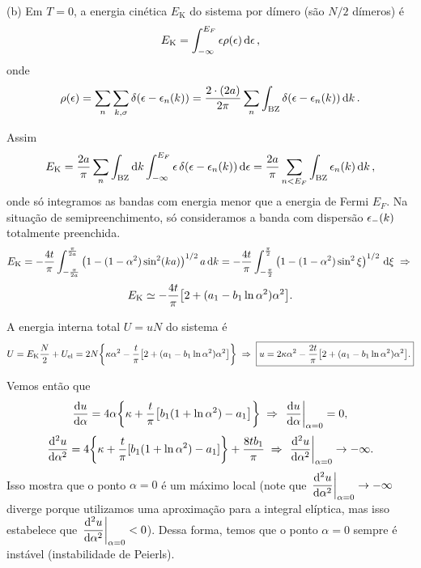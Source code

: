 \documentclass[a4paper,10pt]{article}
\begin{document}
(b) Em $T = 0$, a energia cinética $E_{\text{K}}$ do sistema por dímero (são $N/2$ dímeros) é
$$
E_{\text{K}} = \int_{-\infty}^{E_F} \epsilon \rho(\epsilon) \dd{\epsilon},
$$
onde
$$
\rho(\epsilon) = \sum_{n} \sum_{k, \sigma} \delta(\epsilon - \epsilon_n(k)) =
\frac{2 \cdot (2a)}{2\pi}
\sum_{n} \int_{\text{BZ}} \delta(\epsilon - \epsilon_n(k)) \dd{k}.
$$

Assim
$$
E_{\text{K}} = \frac{2a}{\pi} \sum_{n} \int_{\text{BZ}} \dd{k}
\int_{-\infty}^{E_F} \epsilon \, \delta(\epsilon - \epsilon_n(k)) \dd{\epsilon} =
\frac{2a}{\pi} \sum_{n < E_F} \int_{\text{BZ}} \epsilon_n(k) \dd{k},
$$
onde só integramos as bandas com energia menor que a energia de Fermi $E_F$. Na situação de semipreenchimento, só consideramos a banda com dispersão $\epsilon_-(k)$ totalmente preenchida.
$$
E_{\text{K}} = - \frac{4t}{\pi} \int_{-\frac{\pi}{2a}}^{\frac{\pi}{2a}}
\qty(1 - (1-\alpha^2) \sin[2](ka))^{1/2} \, a\dd{k} =
- \frac{4t}{\pi} \int_{-\frac{\pi}{2}}^{\frac{\pi}{2}}
\qty(1 - (1-\alpha^2) \sin^2\xi)^{1/2} \, \dd{\xi} \; \Rightarrow \;
$$
$$
E_{\text{K}} \simeq -\frac{4t}{\pi}
\qty[2 + (a_1 - b_1 \ln \alpha^2) \alpha^2].
$$

A energia interna total $U = u N$ do sistema é
$$
U = E_{\text{K}} \frac{N}{2} + U_{\text{el}} =
2N \qty{\kappa \alpha^2 -\frac{t}{\pi}
\qty[2 + (a_1 - b_1 \ln \alpha^2) \alpha^2]} \; \Rightarrow \; \boxed{u = 2 \kappa \alpha^2 - \frac{2t}{\pi}
\qty[2 + (a_1 - b_1 \ln \alpha^2) \alpha^2].}
$$

Vemos então que
$$
\dv{u}{\alpha} = 4 \alpha \qty{\kappa + \frac{t}{\pi} \qty[b_1 (1  + \ln \alpha^2) - a_1 ]}
\implies \eval{\dv{u}{\alpha}}_{\alpha=0} = 0,
$$
$$
\dv[2]{u}{\alpha} = 4\qty{\kappa + \frac{t}{\pi}[b_1(1+\ln\alpha^2) - a_1]} + \frac{8t b_1}{\pi} \implies
\eval{\dv[2]{u}{\alpha}}_{\alpha = 0} \to -\infty.
$$
Isso mostra que o ponto $\alpha = 0$ é um máximo local (note que $\displaystyle{\eval{\dv[2]{u}{\alpha}}_{\alpha = 0} \to -\infty}$ diverge porque utilizamos uma aproximação para a integral elíptica, mas isso estabelece que $\displaystyle{\eval{\dv[2]{u}{\alpha}}_{\alpha = 0} < 0}$). Dessa forma, temos que o ponto $\alpha = 0$ sempre é instável (instabilidade de Peierls).

\n\n
\end{document}

